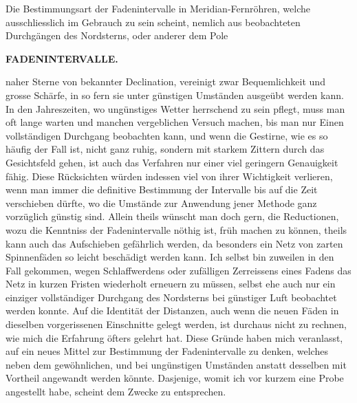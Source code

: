 Die Bestimmungsart der Fadenintervalle in Meridian-Fernröhren, welche ausschliesslich im Gebrauch zu
sein scheint, nemlich aus beobachteten Durchgängen des Nordsterns, oder anderer dem Pole
\par
{}
\thispagestyle{gaussVIGathering87}
\clearpage
\thispagestyle{empty}
\noindent{}%
%
\parbox[t]{\dimexpr\linewidth-24mm\relax}{\centering\footnotesize\bfseries FADENINTERVALLE.\par}%
\makebox[12mm][r]{}\par\nobreak\medskip
\noindent naher Sterne von bekannter Declination, vereinigt zwar Bequemlichkeit und grosse Schärfe, in so fern
sie unter günstigen Umständen ausgeübt werden kann. In den Jahreszeiten, wo ungünstiges Wetter
herrschend zu sein pflegt, muss man oft lange warten und manchen vergeblichen Versuch machen, bis
man nur Einen vollständigen Durchgang beobachten kann, und wenn die Gestirne, wie es so häufig der
Fall ist, nicht ganz ruhig, sondern mit starkem Zittern durch das Gesichtsfeld gehen, ist auch das
Verfahren nur einer viel geringern Genauigkeit fähig. Diese Rücksichten würden indessen viel von
ihrer Wichtigkeit verlieren, wenn man immer die definitive Bestimmung der Intervalle bis auf die Zeit
verschieben dürfte, wo die Umstände zur Anwendung jener Methode ganz vorzüglich günstig sind. Allein
theils wünscht man doch gern, die Reductionen, wozu die Kenntniss der Fadenintervalle nöthig ist, früh
machen zu können, theils kann auch das Aufschieben gefährlich werden, da besonders ein Netz von
zarten Spinnenfäden so leicht beschädigt werden kann. Ich selbst bin zuweilen in den Fall gekommen,
wegen Schlaffwerdens oder zufälligen Zerreissens eines Fadens das Netz in kurzen Fristen wiederholt
erneuern zu müssen, selbst ehe auch nur ein einziger vollständiger Durchgang des Nordsterns bei
günstiger Luft beobachtet werden konnte. Auf die Identität der Distanzen, auch wenn die neuen Fäden
in dieselben vorgerissenen Einschnitte gelegt werden, ist durchaus nicht zu rechnen, wie mich die
Erfahrung öfters gelehrt hat. Diese Gründe haben mich veranlasst, auf ein neues Mittel zur Bestimmung
der Fadenintervalle zu denken, welches neben dem gewöhnlichen, und bei ungünstigen Umständen anstatt
desselben mit Vortheil angewandt werden könnte. Dasjenige, womit ich vor kurzem eine Probe angestellt
habe, scheint dem Zwecke zu entsprechen.

